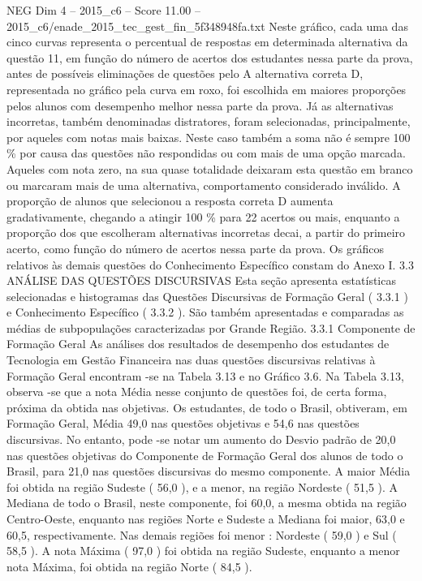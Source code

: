 \begin{textsample}{NEG Dim 4 – 2015\_c6 – Score 11.00 – 2015\_c6/enade\_2015\_tec\_gest\_fin\_5f348948fa.txt}
Neste gráfico, cada uma das cinco curvas representa o percentual de respostas em determinada alternativa da questão 11, em função do número de acertos dos estudantes nessa parte da prova, antes de possíveis eliminações de questões pelo A alternativa correta D, representada no gráfico pela curva em roxo, foi escolhida em maiores proporções pelos alunos com desempenho melhor nessa parte da prova.
Já as alternativas incorretas, também denominadas distratores, foram selecionadas, principalmente, por aqueles com notas mais baixas.
Neste caso também a soma não é sempre 100 \% por causa das questões não respondidas ou com mais de uma opção marcada.
Aqueles com nota zero, na sua quase totalidade deixaram esta questão em branco ou marcaram mais de uma alternativa, comportamento considerado inválido.
A proporção de alunos que selecionou a resposta correta D aumenta gradativamente, chegando a atingir 100 \% para 22 acertos ou mais, enquanto a proporção dos que escolheram alternativas incorretas decai, a partir do primeiro acerto, como função do número de acertos nessa parte da prova.
Os gráficos relativos às demais questões do Conhecimento Específico constam do Anexo I. 3.3 ANÁLISE DAS QUESTÕES DISCURSIVAS Esta seção apresenta estatísticas selecionadas e histogramas das Questões Discursivas de Formação Geral ( 3.3.1 ) e Conhecimento Específico ( 3.3.2 ).
São também apresentadas e comparadas as médias de subpopulações caracterizadas por Grande Região. 3.3.1 Componente de Formação Geral As análises dos resultados de desempenho dos estudantes de Tecnologia em Gestão Financeira nas duas questões discursivas relativas à Formação Geral encontram -se na Tabela 3.13 e no Gráfico 3.6.
Na Tabela 3.13, observa -se que a nota Média nesse conjunto de questões foi, de certa forma, próxima da obtida nas objetivas.
Os estudantes, de todo o Brasil, obtiveram, em Formação Geral, Média 49,0 nas questões objetivas e 54,6 nas questões discursivas.
No entanto, pode -se notar um aumento do Desvio padrão de 20,0 nas questões objetivas do Componente de Formação Geral dos alunos de todo o Brasil, para 21,0 nas questões discursivas do mesmo componente.
A maior Média foi obtida na região Sudeste ( 56,0 ), e a menor, na região Nordeste ( 51,5 ).
A Mediana de todo o Brasil, neste componente, foi 60,0, a mesma obtida na região Centro-Oeste, enquanto nas regiões Norte e Sudeste a Mediana foi maior, 63,0 e 60,5, respectivamente.
Nas demais regiões foi menor : Nordeste ( 59,0 ) e Sul ( 58,5 ).
A nota Máxima ( 97,0 ) foi obtida na região Sudeste, enquanto a menor nota Máxima, foi obtida na região Norte ( 84,5 ).

\end{textsample}
